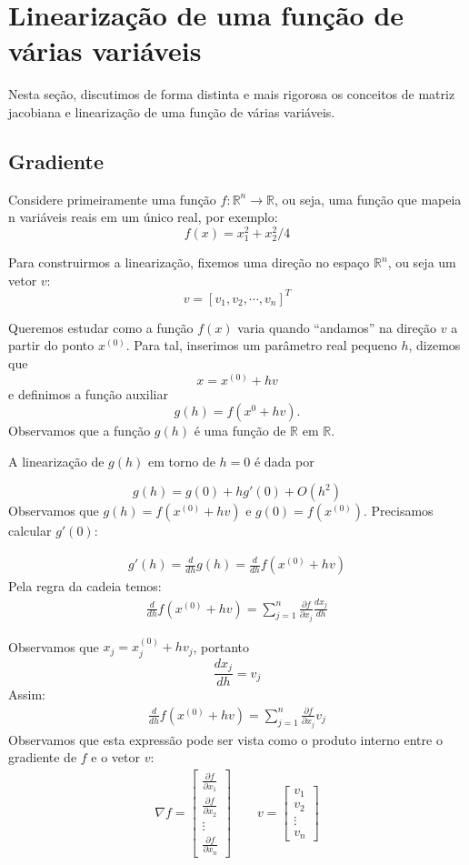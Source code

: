 \section{Linearização de uma função de várias variáveis}
Nesta seção, discutimos de forma distinta e mais rigorosa os conceitos de matriz jacobiana e linearização de uma função de várias variáveis.
\subsection{Gradiente}

Considere primeiramente uma função $f:\mathbb{R}^n\to \mathbb{R}$, ou seja, uma função que mapeia n variáveis reais em um único real, por exemplo:
$$f(x)=x_1^2+x_2^2/4$$

Para construirmos a linearização, fixemos uma direção no espaço $\mathbb{R}^n$, ou seja um vetor $v$:
$$v=[v_1,  v_2,  \cdots,  v_n]^T$$

Queremos estudar como a função $f(x)$ varia quando ``andamos'' na direção $v$ a partir do ponto $x^{(0)}$. Para tal, inserimos um parâmetro  real pequeno $h$, dizemos que $$x=x^{(0)}+hv$$ e definimos a função auxiliar
$$g(h)=f(x^{0}+hv).$$
Observamos que a função $g(h)$ é uma função de $\mathbb{R}$ em $\mathbb{R}$.



A linearização de $g(h)$ em torno de $h=0$ é dada por

$$g(h)=g(0) + hg'(0) +O(h^2)$$
Observamos que $g(h)=f(x^{(0)}+hv)$ e $g(0)=f(x^{(0)})$. Precisamos calcular $g'(0)$:

\begin{eqnarray*}
g'(h)=\frac{d}{dh}g(h)=\frac{d}{dh}f(x^{(0)}+hv)
\end{eqnarray*}
Pela regra da cadeia temos:
\begin{eqnarray*}
\frac{d}{dh}f(x^{(0)}+hv)= \sum_{j=1}^n \frac{\partial f}{\partial x_j}\frac{d x_j}{d h}
\end{eqnarray*}

Observamos que $x_j=x^{(0)}_j+hv_j$, portanto
$$\frac{d x_j}{d h}=v_j$$
Assim:
\begin{eqnarray*}
\frac{d}{dh}f(x^{(0)}+hv)= \sum_{j=1}^n \frac{\partial f}{\partial x_j}v_j
\end{eqnarray*}
Observamos que esta expressão pode ser vista como o produto interno entre o gradiente de $f$ e o vetor $v$:
\begin{eqnarray*}
\nabla f = \left[
\begin{matrix}
\frac{\partial f}{\partial x_1} \\
\frac{\partial f}{\partial x_2} \\
\vdots\\
\frac{\partial f}{\partial x_n}
\end{matrix}
\right] \qquad v=\left[
\begin{matrix}
v_1\\
v_2\\
\vdots\\
v_n
\end{matrix}
\right]
\end{eqnarray*}

